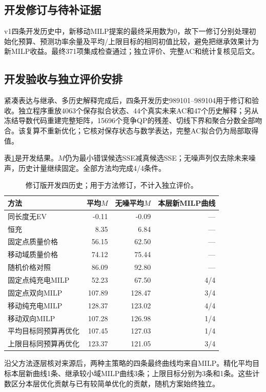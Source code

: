 \documentclass[UTF8,fontset=fandol,11pt,a4paper]{ctexart}
\begin{document}
\subsection{开发修订与待补证据}
v1四条开发历史中，新移动MILP提案的最终采用数为0，故下一修订分别处理初始化预算、预测功率余量及平均/上限目标的相同初值比较，避免把继承效果计为新MILP收益。最终371项集成检查通过；独立评价、完整AC和统计复核见后文。




\subsection{开发验收与独立评价安排}
紧凑表达与继承、多历史解释完成后，四条开发历史989101--989104用于修订和验收。独立程序重放4063个保存拟合状态、44个真实未来AC和47个历史解释；另从冻结导数代码重建完整矩阵，15696个竞争QP的残差、切线下界和聚合分数全部吻合。该复算不重新优化；它核对保存状态与数学表达，完整AC拟合仍为局部取得值。

表\ref{tab:compact-development}是开发结果。$M$仍为最小错误候选SSE减真候选SSE；无噪声列仅去除未来噪声，历史计量继续固定。全部方法均完成4/4条件。
\begin{table}[htbp]
\centering\small
\caption{修订版开发四历史；用于方法修订，不计入独立评价。}
\label{tab:compact-development}
\begin{tabular}{lrrr}\toprule
方法 & 平均$M$ & 无噪平均$M$ & 本层新MILP曲线\\\midrule
同长度无EV & -0.11 & -0.09 & ---\\
恒充 & 8.35 & 6.84 & ---\\
固定点质量价格 & 56.15 & 62.50 & ---\\
移动域质量价格 & 74.12 & 75.44 & ---\\
随机价格对照 & 86.09 & 92.80 & ---\\
固定点纯充电MILP & 52.23 & 67.50 & 4/4\\
固定点双向MILP & 107.89 & 128.47 & 3/4\\
移动纯充电MILP & 128.37 & 123.02 & 4/4\\
移动双向MILP & 107.28 & 126.98 & 1/4\\
平均目标同预算再优化 & 107.45 & 127.03 & 1/4\\
上限目标同预算再优化 & 123.37 & 121.05 & 3/4\\
\bottomrule\end{tabular}
\end{table}
沿父方法逐层核对来源后，两种主策略的四条最终曲线均来自MILP。精化平均目标本层新曲线1条、继承较小域MILP曲线3条；上限目标分别为3条和1条。这些计数区分本层优化贡献与已有较简单优化的贡献，随机方案始终独立。
\end{document}
